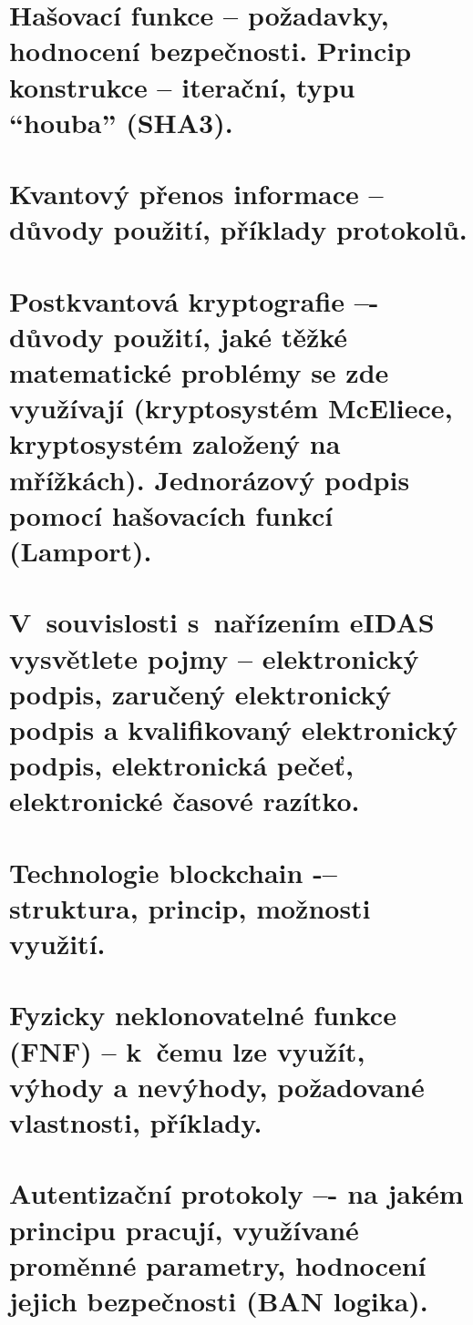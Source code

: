 \clearpage
\section{Hašovací funkce -- požadavky, hodnocení bezpečnosti. Princip konstrukce -- iterační, typu \enquote{houba} (SHA3).}

\clearpage
\section{Kvantový přenos informace -- důvody použití, příklady protokolů.}

\clearpage
\section{Postkvantová kryptografie –- důvody použití, jaké těžké matematické problémy se zde využívají (kryptosystém McEliece, kryptosystém založený na mřížkách). Jednorázový podpis pomocí hašovacích funkcí (Lamport).}

\clearpage
\section{V~souvislosti s~nařízením eIDAS vysvětlete pojmy -- elektronický podpis, zaručený elektronický podpis a kvalifikovaný elektronický podpis, elektronická pečeť, elektronické časové razítko.}

\clearpage
\section{Technologie blockchain -– struktura, princip, možnosti využití.}

\clearpage
\section{Fyzicky neklonovatelné funkce (FNF) -- k~čemu lze využít, výhody a nevýhody, požadované vlastnosti, příklady.}

\clearpage
\section{Autentizační protokoly –- na jakém principu pracují, využívané proměnné parametry, hodnocení jejich bezpečnosti (BAN logika).}
